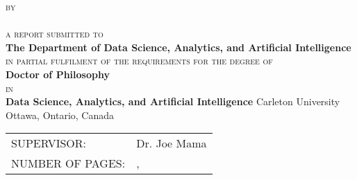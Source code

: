 \begin{titlepage}
  \thispagestyle{empty}
  \centering
  \vspace*{\fill}
  {\LARGE \textbf{\expandafter{\reporttitleI}}}
  \vfill
  {\scshape by}\\
  {\large \expandafter{\myname}}\\
  \vfill
  {\scshape a report submitted to}\\
  \textbf{The Department of Data Science, Analytics, and Artificial Intelligence}\\
  {\scshape in partial fulfilment of the requirements for the degree of}\\
  \textbf{Doctor of Philosophy}\\
  {\scshape in}\\
  \textbf{Data Science, Analytics, and Artificial Intelligence}
  \vfill
  {\large Carleton University}\\
  {\large Ottawa, Ontario, Canada}
  \vfill
  {\large \textcopyright{} \the\year{}}\\
  {\large \expandafter{\myname}}
\end{titlepage}

\clearpage

\setcounter{page}{2}
\noindent

\vspace*{\fill}

\begin{tabular}{l l}
  SUPERVISOR:      &Dr. Joe Mama\\[5mm]
  NUMBER OF PAGES: &\pageref*{endfrontmatter}, \pageref*{LastPage}
\end{tabular}

\vfill

\clearpage

\tableofcontents

\listoffigures

\listoftables

\listofalgorithms

\label{endfrontmatter} %
